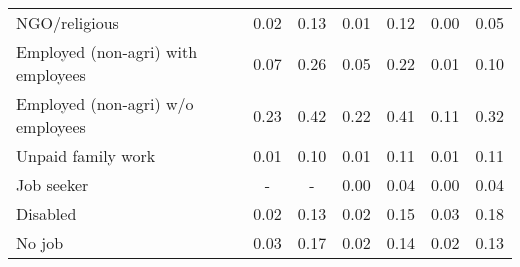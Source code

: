 \begin{table}[htbp]
\begin{tabulary}{1 \textwidth}{Lcccccc}
     NGO/religious &                     0.02  &                     0.13  &                     0.01  &                     0.12  &                      0.00  &                 0.05  \\
     Employed (non-agri) with employees &                     0.07  &                     0.26  &                     0.05  &                     0.22  &                      0.01  &                 0.10  \\
     Employed (non-agri) w/o employees &                     0.23  &                     0.42  &                     0.22  &                     0.41  &                      0.11  &                 0.32  \\
     Unpaid family work &                     0.01  &                     0.10  &                     0.01  &                     0.11  &                      0.01  &                 0.11  \\
    Job seeker &                          -    &                          -    &                     0.00  &                     0.04  &                      0.00  &                 0.04  \\
     
     Disabled  &                     0.02  &                     0.13  &                     0.02  &                     0.15  &                      0.03  &                 0.18  \\
     No job &                     0.03  &                     0.17  &                     0.02  &                     0.14  &                      0.02  &                 0.13  \\
    \bottomrule
    \end{tabulary}%
    \label{tab:addlabel}%

\end{table}%
